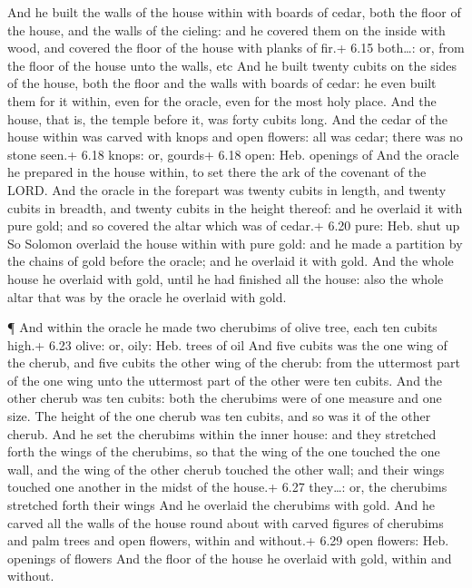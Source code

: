  And he built the walls of the house within with boards of
cedar, both the floor of the house, and the walls of the cieling: and he
covered them on the inside with wood, and covered the floor of the house
with planks of fir.+ 6.15 both\ldots: or, from the floor of the house
unto the walls, etc  And he built twenty cubits on the
sides of the house, both the floor and the walls with boards of cedar:
he even built them for it within, even for the oracle, even for the most
holy place.  And the house, that is, the temple before it,
was forty cubits long.  And the cedar of the house within
was carved with knops and open flowers: all was cedar; there was no
stone seen.+ 6.18 knops: or, gourds+ 6.18 open: Heb. openings of
 And the oracle he prepared in the house within, to set
there the ark of the covenant of the LORD.  And the oracle
in the forepart was twenty cubits in length, and twenty cubits in
breadth, and twenty cubits in the height thereof: and he overlaid it
with pure gold; and so covered the altar which was of cedar.+ 6.20 pure:
Heb. shut up  So Solomon overlaid the house within with
pure gold: and he made a partition by the chains of gold before the
oracle; and he overlaid it with gold.  And the whole house
he overlaid with gold, until he had finished all the house: also the
whole altar that was by the oracle he overlaid with gold.

 ¶ And within the oracle he made two cherubims of olive
tree, each ten cubits high.+ 6.23 olive: or, oily: Heb. trees of oil
 And five cubits was the one wing of the cherub, and five
cubits the other wing of the cherub: from the uttermost part of the one
wing unto the uttermost part of the other were ten cubits. 
And the other cherub was ten cubits: both the cherubims were of one
measure and one size.  The height of the one cherub was ten
cubits, and so was it of the other cherub.  And he set the
cherubims within the inner house: and they stretched forth the wings of
the cherubims, so that the wing of the one touched the one wall, and the
wing of the other cherub touched the other wall; and their wings touched
one another in the midst of the house.+ 6.27 they\ldots: or, the
cherubims stretched forth their wings  And he overlaid the
cherubims with gold.  And he carved all the walls of the
house round about with carved figures of cherubims and palm trees and
open flowers, within and without.+ 6.29 open flowers: Heb. openings of
flowers  And the floor of the house he overlaid with gold,
within and without.


